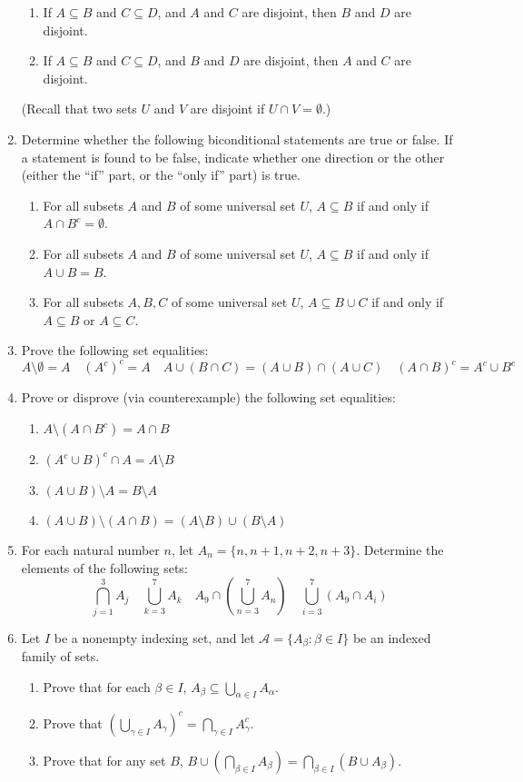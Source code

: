 \documentclass[letterpaper,12pt]{article}
\begin{document}
\begin{enumerate}
\begin{enumerate}
 \item If $A\subseteq B$ and $C\subseteq D$, and $A$ and $C$ are disjoint, then $B$ and $D$ are disjoint.
 \item If $A\subseteq B$ and $C\subseteq D$, and $B$ and $D$ are disjoint, then $A$ and $C$ are disjoint.
\end{enumerate}
(Recall that two sets $U$ and $V$ are disjoint if $U\cap V=\emptyset$.)
 \item Determine whether the following biconditional statements are true or false. If a statement is found to be false, indicate whether one direction or the other (either the ``if'' part, or the ``only if'' part) is true. 
\begin{enumerate}
 \item For all subsets $A$ and $B$ of some universal set $U$, $A\subseteq B$ if and only if $A\cap B^c=\emptyset$.
 \item For all subsets $A$ and $B$ of some universal set $U$, $A\subseteq B$ if and only if $A\cup B=B$.
 \item For all subsets $A,B,C$ of some universal set $U$, $A\subseteq B\cup C$ if and only if $A\subseteq B$ or $A\subseteq C$.
\end{enumerate}
 \item Prove the following set equalities:
\[
 A\setminus \emptyset = A\quad (A^c)^c = A\quad A\cup (B\cap C) = (A\cup B)\cap(A\cup C)\quad (A\cap B)^c = A^c\cup B^c
\]
 \item Prove or disprove (via counterexample) the following set equalities:
\begin{enumerate}
 \item $A\setminus (A\cap B^c) = A\cap B$
 \item $(A^c\cup B)^c\cap A = A\setminus B$
 \item $(A\cup B)\setminus A = B\setminus A$
 \item $(A\cup B)\setminus (A\cap B) = (A\setminus B)\cup (B\setminus A)$
\end{enumerate}
 \item For each natural number $n$, let $A_n = \{n,n+1,n+2,n+3\}$. Determine the elements of the following sets:
\[
 \bigcap_{j=1}^3 A_j\quad \bigcup_{k=3}^7 A_k\quad A_9\cap\left(\bigcup_{n=3}^7A_n\right)\quad \bigcup_{i=3}^7(A_9\cap A_i)
\]
 \item Let $I$ be a nonempty indexing set, and let $\mathcal{A} = \{A_\beta:\beta\in I\}$ be an indexed family of sets.
\begin{enumerate}
 \item Prove that for each $\beta\in I$, $\displaystyle A_\beta \subseteq \bigcup_{\alpha\in I}A_\alpha$.
 \item Prove that $\displaystyle \left(\bigcup_{\gamma\in I}A_\gamma\right)^c = \bigcap_{\gamma\in I}A_\gamma^c$.
 \item Prove that for any set $B$, $\displaystyle B\cup \left(\bigcap_{\beta\in I}A_\beta\right) = \bigcap_{\beta\in I}(B\cup A_\beta)$.
\end{enumerate}

\end{enumerate}
\end{document}
